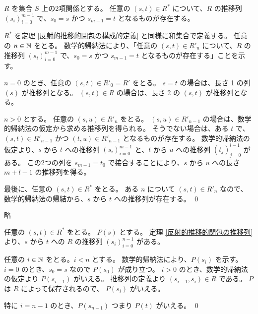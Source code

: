 \begin{jtheorem}[反射的推移的閉包の推移列]
  \label{反射的推移的閉包の推移列}
  $R$ を集合 $S$ 上の2項関係とする。
  任意の $(s, t) \in R^*$ について、$R$ の推移列 $(s_i)_{i=0}^{m-1}$ で、$s_0 = s$ かつ $s_{m-1} = t$ となるものが存在する。
\end{jtheorem}
\begin{jproof}
  $R^*$ を定理 \ref{反射的推移的閉包の構成的定義} と同様に和集合で定義する。
  任意の $n \in \mathbb{N}$ をとる。
  数学的帰納法により、「任意の $(s, t) \in R'_n$ について、$R$ の推移列 $(s_i)_{i=0}^{m-1}$ で、$s_0 = s$ かつ $s_{m-1} = t$ となるものが存在する」ことを示す。

  $n = 0$ のとき、任意の $(s, t) \in R'_0 = R'$ をとる。
  $s = t$ の場合は、長さ 1 の列 $(s)$ が推移列となる。
  $(s, t) \in R$ の場合は、長さ 2 の $(s, t)$ が推移列となる。

  $n > 0$ とする。
  任意の $(s, u) \in R'_n$ をとる。
  $(s, u) \in R'_{n-1}$ の場合は、数学的帰納法の仮定から求める推移列を得られる。
  そうでない場合は、ある $t$ で、$(s, t) \in R'_{n-1}$ かつ $(t, u) \in R'_{n-1}$ となるものが存在する。
  数学的帰納法の仮定より、$s$ から $t$ への推移列 $(s_i)_{i=0}^{m-1}$ と、$t$ から $u$ への推移列 $(t_j)_{j=0}^{l-1}$ がある。
  この2つの列を $s_{m-1} = t_0$ で接合することにより、$s$ から $u$ への長さ $m + l - 1$ の推移列を得る。

  最後に、任意の $(s, t) \in R^*$ をとる。
  ある $n$ について $(s, t) \in R'_n$ なので、数学的帰納法の帰結から、$s$ から $t$ への推移列が存在する。
  \qed
\end{jproof}

\begin{jexercise*}[2.2.8]
  略
\end{jexercise*}
\begin{jproof}
  任意の $(s, t) \in R^*$ をとる。
  $P(s)$ とする。
  定理 \ref{反射的推移的閉包の推移列} より、$s$ から $t$ への $R$ の推移列 $(s_i)_{i=0}^{n-1}$ がある。

  任意の $i \in \mathbb{N}$ をとる。$i < n$ とする。
  数学的帰納法により、$P(s_i)$ を示す。
  $i = 0$ のとき、$s_0 = s$ なので $P(s_0)$ が成り立つ。
  $i > 0$ のとき、数学的帰納法の仮定より $P(s_{i-1})$ がいえる。
  推移列の定義より $(s_{i-1}, s_i) \in R$ である。
  $P$ は $R$ によって保存されるので、 $P(s_i)$ がいえる。

  特に $i = n - 1$ のとき、$P(s_{n-1})$ つまり $P(t)$ がいえる。
  \qed
\end{jproof}
